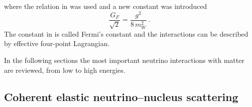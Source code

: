 where the relation in  was used and a new constant was introduced 
\begin{equation}
	\label{eq:fermi_const}
	\frac{G_F}{\sqrt{2}} = \frac{g^2}{8\,m_W^2}\ .
\end{equation}
The constant in  is called Fermi's constant and the interactions %
can be described by effective four-point Lagrangian.
						    
In the following sections the most important neutrino interactions with matter are reviewed, %
from low to high energies.

\subsection{Coherent elastic neutrino--nucleus scattering}
\label{sec:cevns}


